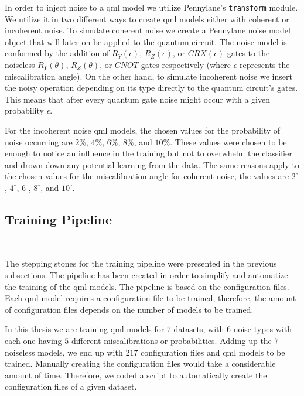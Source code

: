 In order to inject noise to a \ac{qml} model we utilize Pennylane's
\colorbox{inline_gray}{\lstinline|transform|} module. We utilize it
in two different ways to create \ac{qml} models either with coherent
or incoherent noise. To simulate coherent noise we create a Pennylane
noise model object that will later on be applied to the quantum circuit.
The noise model is conformed by the addition of \(R_{Y}(\epsilon)\),
\(R_{Z}(\epsilon)\), or \(CRX(\epsilon)\) gates to the noiseless
\(R_{Y}(\theta)\), \(R_{Z}(\theta)\), or \(CNOT\) gates respectively
(where \(\epsilon\) represents the miscalibration angle). On the other
hand, to simulate incoherent noise we insert the noisy operation
depending on its type directly to the quantum circuit's gates.
This means that after every quantum gate noise might occur with
a given probability \(\epsilon\). \

For the incoherent noise \ac{qml} models, the chosen values for the
probability of noise occurring are \(2\%\), \(4\%\), \(6\%\), \(8\%\),
and \(10\%\). These values were chosen to be enough to notice an
influence in the training but not to overwhelm the classifier and
drown down any potential learning from the data. The same reasons
apply to the chosen values for the miscalibration angle for coherent
noise, the values are \(2^{\circ}\), \(4^{\circ}\), \(6^{\circ}\),
\(8^{\circ}\), and \(10^{\circ}\). \

\subsection{Training Pipeline}\label{subsection:pipeline} \

The stepping stones for the training pipeline were presented
in the previous subsections. The pipeline has been created
in order to simplify and automatize the training of the
\ac{qml} models. The pipeline is based on the configuration
files. Each \ac{qml} model requires a configuration file to
be trained, therefore, the amount of configuration files
depends on the number of models to be trained. \

In this thesis we are training \ac{qml} models for \(7\)
datasets, with \(6\) noise types with each one having \(5\)
different miscalibrations or probabilities. Adding up
the \(7\) noiseless models, we end up with \(217\) configuration
files and \ac{qml} models to be trained. Manually creating
the configuration files would take a considerable
amount of time. Therefore, we coded a script to
automatically create the configuration files of a
given dataset. \

